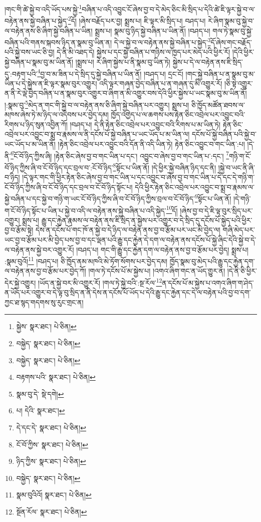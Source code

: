 །གང་གི་ཚེ་སྐྱེ་བ་འདི་ཡོད་པས་སྐྱེ་\footnote{སྐྱེས་  སྣར་ཐང་།  པེ་ཅིན། }བཞིན་པ་འདི་འབྱུང་ངོ་ཞེས་བྱ་བ་དེ་མེད་ཅིང་མི་སྲིད་པ་དེའི་ཚེ་ཇི་ལྟར་སྐྱེ་བ་ལ་བརྟེན་ནས་སྐྱེ་བཞིན་པ་སྐྱེད་\footnote{བསྐྱེད་  སྣར་ཐང་།  པེ་ཅིན། }དོ། །ཞེས་བརྗོད་པར་བྱ། སྨྲས་པ། ཇི་ལྟར་མི་སྲིད་པ། བཤད་པ། རེ་ཞིག་སྣམ་བུ་སྐྱེ་བ་ལ་བརྟེན་ནས་ཅི་ཞིག་སྐྱེ་བཞིན་པ་ཡིན། སྨྲས་པ། སྣམ་བུ་ཉིད་སྐྱེ་བཞིན་པ་ཡིན་ནོ། །བཤད་པ། གལ་ཏེ་སྣམ་བུ་སྐྱེ་བཞིན་པའི་གནས་སྐབས་ཉིད་ན་སྣམ་བུ་ཡིན་ན། དེ་ལ་སྐྱེ་བ་ལ་བརྟེན་ནས་སྐྱེ་བཞིན་པ་སྐྱེད་\footnote{བསྐྱེད་  སྣར་ཐང་།  པེ་ཅིན། }དོ་ཞེས་གང་བརྗོད་པའི་སྐྱེ་བས་ཡང་ཅི་བྱ། དེ་ནི་མི་འཐད་དེ། སྐྱེས་པ་དང་སྐྱེ་བཞིན་པ་གཉིས་ལ་ཁྱད་པར་མེད་པའི་ཕྱིར་རོ། །དེའི་ཕྱིར་སྐྱེ་བཞིན་པ་སྣམ་བུ་མ་ཡིན་ནོ། །སྨྲས་པ། རེ་ཞིག་སྐྱེས་པ་ནི་སྣམ་བུ་ཡིན་ཏེ། སྐྱེས་པ་དེ་ལ་བརྟེན་ནས་ཇི་སྲིད་དུ་:བརྟག་པའི་\footnote{བརྟགས་པའི་  སྣར་ཐང་།  པེ་ཅིན། }བྱ་བ་མ་ཟིན་པ་དེ་སྲིད་དུ་སྐྱེ་བཞིན་པ་ཡིན་ནོ། །བཤད་པ། དྲང་ངོ། །གང་སྐྱེ་བཞིན་པ་ན་སྣམ་བུ་མ་ཡིན་པ་དེ་སྐྱེས་ན་ཇི་ལྟར་སྣམ་བུར་འགྱུར། འདི་ལྟར་གཞན་བྱེད་བཞིན་པ་ན་གཞན་དུ་མི་འགྱུར་རོ། །ཅི་སྟེ་འགྱུར་ན་ནི་རེ་ལྡེ་བྱེད་བཞིན་པ་ན་སྣམ་བུར་འགྱུར་བ་ཞིག་ན་མི་འགྱུར་བས་དེའི་ཕྱིར་སྐྱེས་པ་ཡང་སྣམ་བུ་མ་ཡིན་ནོ། །:སྣམ་བུ་\footnote{སྣམ་བུ་དེ་  སྡེ་དགེ། }མེད་ན་གང་གི་སྐྱེ་བ་ལ་བརྟེན་ནས་ཅི་ཞིག་སྐྱེ་བཞིན་པར་འགྱུར། སྨྲས་པ། ཅི་ཁྱོད་མཚོན་ཐབས་ལ་མཁས་ཞེས་ཏེ་མ་ཉིད་ལ་འདེབས་པར་བྱེད་དམ། ཁྱོད་འགྱེད་པ་ལ་ཆགས་པས་རྟེན་ཅིང་འབྲེལ་པར་འབྱུང་བའི་རིགས་པ་ཉིད་སུན་འབྱིན་ཀོ། །བཤད་པ། དེ་ནི་རྟེན་ཅིང་འབྲེལ་པར་འབྱུང་བའི་རིགས་པ་མ་ཡིན་ཏེ། རྟེན་ཅིང་འབྲེལ་པར་འབྱུང་བ་སྨྲ་བ་རྣམས་ལ་ནི་དངོས་པོ་སྐྱེ་བཞིན་པ་ཡང་ཡོད་པ་མ་ཡིན་ལ། དངོས་པོ་སྐྱེ་བཞིན་པའི་སྐྱེ་བ་ཡང་ཡོད་པ་མ་ཡིན་ནོ། །རྟེན་ཅིང་འབྲེལ་པར་འབྱུང་བའི་དོན་ནི་འདི་ཡིན་ཏེ། རྟེན་ཅིང་འབྱུང་བ་གང་ཡིན་:པ། །དེ་ནི་\footnote{པ། དེའི་  སྣར་ཐང་། }ངོ་བོ་ཉིད་ཀྱིས་ཞི། །རྟེན་ཅིང་ཞེས་བྱ་བ་གང་ཡིན་པ་དང་། འབྱུང་བ་ཞེས་བྱ་བ་གང་ཡིན་པ་:དང་། \footnote{དེ་དང་དེ་  སྣར་ཐང་།  པེ་ཅིན། }གཉི་ག་ངོ་བོ་ཉིད་ཀྱིས་ཞི་བ་ངོ་བོ་ཉིད་དང་བྲལ་བ་:ངོ་བོ་ཉིད་\footnote{ངོ་བོ་ཀྱིས་  སྣར་ཐང་།  པེ་ཅིན། }སྟོང་པ་ཡིན་ནོ། །དེ་ཕྱིར་སྐྱེ་བཞིན་ཉིད་དང་ནི། །སྐྱེ་བ་ཡང་ནི་ཞི་བ་ཉིད། །དེ་ལྟར་གང་གི་ཕྱིར་རྟེན་ཅིང་ཞེས་བྱ་བ་གང་ཡིན་པ་དང་འབྱུང་བ་ཞེས་བྱ་བ་གང་ཡིན་པ་དེ་དང་དེ་གཉི་ག་ངོ་བོ་ཉིད་ཀྱིས་ཞི་བ་ངོ་བོ་ཉིད་དང་བྲལ་བ་ངོ་བོ་ཉིད་སྟོང་པ། དེའི་ཕྱིར་རྟེན་ཅིང་འབྲེལ་པར་འབྱུང་བ་སྨྲ་བ་རྣམས་ལ་སྐྱེ་བཞིན་པ་དང་སྐྱེ་བ་གཉི་ག་ཡང་ངོ་བོ་ཉིད་ཀྱིས་ཞི་བ་ངོ་བོ་ཉིད་ཀྱིས་བྲལ་བ་ངོ་བོ་ཉིད་\footnote{ཉིད་ཀྱིས་  སྣར་ཐང་།  པེ་ཅིན། }སྟོང་པ་ཡིན་ནོ། །དེ་གཉི་ག་ངོ་བོ་ཉིད་སྟོང་པ་ཡིན་པ་སྐྱེ་བ་འདི་ལ་བརྟེན་ནས་སྐྱེ་བཞིན་པ་འདི་སྐྱེད་\footnote{བསྐྱེད་  སྣར་ཐང་།  པེ་ཅིན། }དོ། །ཞེས་བྱ་བ་དེ་ཇི་ལྟ་བུར་སྲིད་པར་འགྱུར། སྨྲས་པ། རྒྱུ་དང་རྐྱེན་རྣམས་ལ་བརྟེན་ནས་ཇི་སྲིད་ན་སྐྱེས་པར་འགྱུར་བ་དེ་སྲིད་དུ་དངོས་པོ་སྐྱེད་པའི་ཕྱིར་བྱ་བ་རྩོམ་སྟེ། དེས་ན་དངོས་པོ་གང་ཁོ་ན་སྐྱེ་བ་དེ་ཉིད་ལ་བརྟེན་ནས་བྱ་བ་རྩོམ་པར་ཡང་མི་བྱེད་ལ། གཞི་མེད་པར་ཡང་བྱ་བ་རྩོམ་པར་མི་བྱེད་པས་བྱ་བ་དང་ལྡན་པའི་རྒྱུ་དང་རྐྱེན་དེ་དག་ལ་བརྟེན་ནས་དངོས་པོ་སྐྱེ་ཞིང་དེའི་སྐྱེ་བ་དེ་ལ་བརྟེན་ནས་སྐྱེ་བར་འགྱུར་རོ། །བཤད་པ། གང་གི་རྒྱུ་དང་རྐྱེན་དག་ལ་བརྟེན་ནས་བྱ་བ་རྩོམ་པར་བྱེད། སྨྲས་པ། :སྣམ་བུའོ།\footnote{སྣམ་བུའིའོ།  སྣར་ཐང་།  པེ་ཅིན། } །བཤད་པ། ཅི་ཁྱོད་ནམ་མཁའི་མེ་ཏོག་སོགས་པར་བྱེད་དམ། ཁྱོད་སྣམ་བུ་མེད་པའི་རྒྱུ་དང་རྐྱེན་དག་ལ་བརྟེན་ནས་བྱ་བ་རྩོམ་པར་བྱེད་ཀོ། །གལ་ཏེ་དངོས་པོ་མ་སྐྱེས་པ། །འགའ་ཞིག་གང་ན་ཡོད་གྱུར་ན། །དེ་ནི་ཅི་ཕྱིར་དེར་སྐྱེ་འགྱུར། །ཡོད་ན་སྐྱེ་བར་མི་འགྱུར་རོ། །གལ་ཏེ་སྐྱེ་བའི་:སྔ་རོལ་\footnote{སྔོན་རོལ་  སྣར་ཐང་།  པེ་ཅིན། }ན་དངོས་པོ་མ་སྐྱེས་པ་འགའ་ཞིག་ག་ཤེད་ན་ཡོད་པར་འགྱུར་བ་དེ་ལྟ་བུ་སྲིད་ན་ནི་དེས་ན་དངོས་པོ་ཡོད་པ་དེའི་རྒྱུ་དང་རྐྱེན་དང་དེ་ལ་བརྟེན་པའི་བྱ་བ་དག་ཀྱང་ཐ་སྙད་གདགས་སུ་རུང་གྲང་ན། 